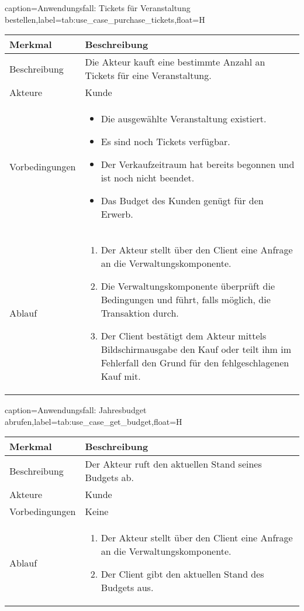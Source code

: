 \begin{dhbwtable}{caption={Anwendungsfall: Tickets für Veranstaltung bestellen},label=tab:use_case_purchase_tickets,float=H}
    \begin{tabularx}{\textwidth}{lX}
        \toprule
        \textbf{Merkmal} & \textbf{Beschreibung}  \\ \midrule
        Beschreibung    &  Die Akteur kauft eine bestimmte Anzahl an Tickets für eine Veranstaltung. \\
        Akteure         &  Kunde \\
        Vorbedingungen  &  \begin{itemize}[leftmargin=*,topsep=0pt,partopsep=0pt,parsep=0pt,itemsep=0pt]
            \item Die ausgewählte Veranstaltung existiert.
            \item Es sind noch Tickets verfügbar.
            \item Der Verkaufzeitraum hat bereits begonnen und ist noch nicht beendet.
            \item Das Budget des Kunden genügt für den Erwerb.
        \end{itemize} \\
        Ablauf          & \begin{enumerate}[leftmargin=*,topsep=0pt,partopsep=0pt,parsep=0pt,itemsep=0pt]
            \item Der Akteur stellt über den Client eine Anfrage an die Verwaltungskomponente.
            \item Die Verwaltungskomponente überprüft die Bedingungen und führt, falls möglich, die Transaktion durch.
            \item Der Client bestätigt dem Akteur mittels Bildschirmausgabe den Kauf oder teilt ihm im Fehlerfall den Grund für den fehlgeschlagenen Kauf mit.
        \end{enumerate} \\\bottomrule
    \end{tabularx}    
\end{dhbwtable}

\begin{dhbwtable}{caption={Anwendungsfall: Jahresbudget abrufen},label=tab:use_case_get_budget,float=H}
    \begin{tabularx}{\textwidth}{lX}
        \toprule
        \textbf{Merkmal} & \textbf{Beschreibung}  \\ \midrule
        Beschreibung    &  Der Akteur ruft den aktuellen Stand seines Budgets ab. \\
        Akteure         &  Kunde \\
        Vorbedingungen  &  Keine \\
        Ablauf          & \begin{enumerate}
            \item Der Akteur stellt über den Client eine Anfrage an die Verwaltungskomponente.
            \item Der Client gibt den aktuellen Stand des Budgets aus.
        \end{enumerate} \\\bottomrule
    \end{tabularx}    
\end{dhbwtable}

